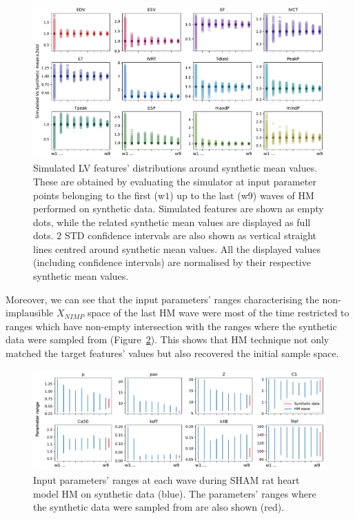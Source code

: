 \begin{figure}[ht!]
    \myfloatalign
    \includegraphics[width=1\textwidth]{figures/chapterA/hm_vs_synt_data_features.pdf}
    \caption{Simulated LV features’ distributions around synthetic mean values. These are obtained by evaluating the simulator at input parameter points belonging to the first (w$1$) up to the last (w$9$) waves of HM performed on synthetic data. Simulated features are shown as empty dots, while the related synthetic mean values are displayed as full dots. $2$ STD confidence intervals are also shown as vertical straight lines centred around synthetic mean values. All the displayed values (including confidence intervals) are normalised by their respective synthetic mean values.}
    \label{fig:syntfeatmatch}
\end{figure}

\vspace{0.2cm}\noindent
Moreover, we can see that the input parameters' ranges characterising the non-implausible $X_{NIMP}$ space of the last HM wave were most of the time restricted to ranges which have non-empty intersection with the ranges where the synthetic data were sampled from (Figure~\ref{fig:syntintmatch}). This shows that HM technique not only matched the target features' values but also recovered the initial sample space.

\begin{figure}[ht!]
    \myfloatalign
    \includegraphics[width=1\textwidth]{figures/chapterA/hm_vs_synt_data_parameters.pdf}
    \caption{Input parameters' ranges at each wave during SHAM rat heart model HM on synthetic data (blue). The parameters' ranges where the synthetic data were sampled from are also shown (red).}
    \label{fig:syntintmatch}
\end{figure}

